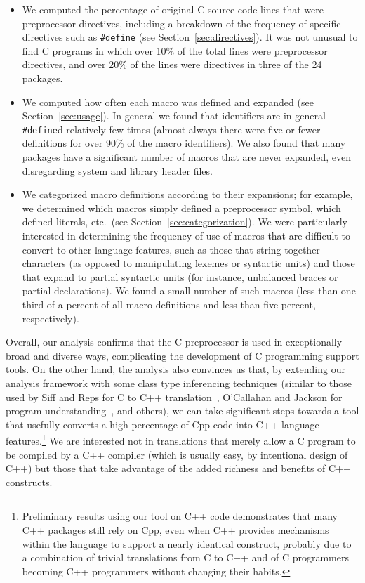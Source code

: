 \documentclass[11pt]{article}
\begin{document}
\begin{itemize}\itemsep 0pt \parskip 0pt

\item We computed the percentage of original C source code lines that
were preprocessor directives, including a breakdown of the frequency
of specific directives such as {\tt \#define} (see
Section~\ref{sec:directives}). It was not unusual to find C programs 
in which over 10\% of the total lines were preprocessor directives, and 
over 20\% of the lines were directives in
three of the 24 packages.

\item We computed how often each macro was defined and expanded (see
Section~\ref{sec:usage}).  In general we found that identifiers are in
general {\tt \#define}d relatively few times (almost always there were
five or fewer definitions for over 90\% of the macro identifiers).  We
also found that many packages have a significant number of macros that are
never expanded, even disregarding system and library header files.


\item We categorized macro definitions according to their expansions;
for example, we determined which macros simply defined a preprocessor
symbol, which defined literals, etc.~(see
Section~\ref{sec:categorization}).  We were particularly interested in
determining the frequency of use of macros that are difficult to convert to
other language features, such as those that string together characters
(as opposed to manipulating lexemes or syntactic units) and those that
expand to partial syntactic units (for instance, unbalanced braces or
partial declarations).
We found a
small number of such macros (less than one third of a percent of all macro
definitions and less than five percent, respectively).
\end{itemize}

Overall, our analysis confirms that the C preprocessor is used in
exceptionally broad and diverse ways, complicating the development of C
programming support tools.  On the other hand, the analysis also
convinces us that, by extending our analysis framework with some class
type inferencing techniques (similar to those used by Siff and Reps for
C to C++ translation~\cite{Siff-fse96}, O'Callahan and Jackson for
program understanding~\cite{OCallahan-icse97}, and others), we can take
significant steps towards a tool that usefully converts a high
percentage of Cpp code into C++ language features.\footnote{Preliminary
  results using our tool on C++ code demonstrates that many C++ packages
  still rely on Cpp, even when C++ provides mechanisms within the
  language to support a nearly identical construct, probably due to a
  combination of trivial translations from C to C++ and of C programmers
  becoming C++ programmers without changing their habits.} We are
interested not in translations that merely allow a C program to be
compiled by a C++ compiler (which is usually easy, by intentional design
of C++) but those that take advantage of the added richness and benefits
of C++ constructs.
\end{document}
